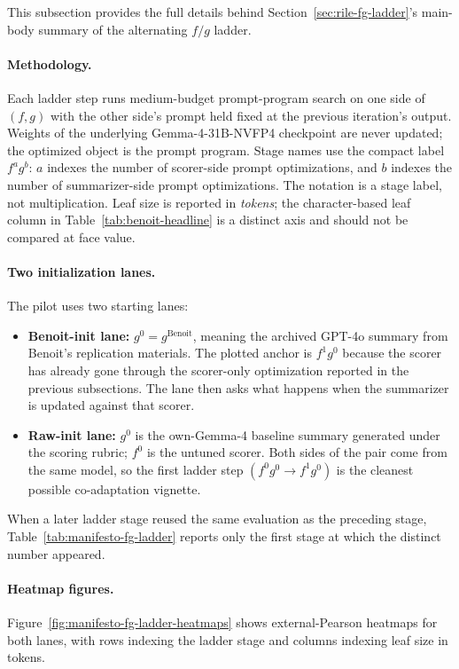 This subsection provides the full details behind
Section~\ref{sec:rile-fg-ladder}'s main-body summary of the alternating
$f/g$ ladder.

\paragraph{Methodology.} Each ladder step runs medium-budget
prompt-program search on one side of $(f, g)$ with the other side's
prompt held fixed at the previous iteration's output. Weights of the
underlying Gemma-4-31B-NVFP4 checkpoint are never updated; the optimized
object is the prompt program. Stage names use the compact label
$f^a g^b$: $a$ indexes the number of scorer-side prompt optimizations,
and $b$ indexes the number of summarizer-side prompt optimizations. The
notation is a stage label, not multiplication. Leaf size is reported in
\emph{tokens}; the character-based leaf column in
Table~\ref{tab:benoit-headline} is a distinct axis and should not be
compared at face value.

\paragraph{Two initialization lanes.} The pilot uses two starting
lanes:
\begin{itemize}[leftmargin=1.5em]
    \item \textbf{Benoit-init lane:} $g^0 = g^{\mathrm{Benoit}}$, meaning the
          archived GPT-4o summary from Benoit's replication materials.
          The plotted anchor is $f^1 g^0$ because the scorer has already
          gone through the scorer-only optimization reported in the
          previous subsections. The lane then asks what happens when the
          summarizer is updated against that scorer.
    \item \textbf{Raw-init lane:} $g^0$ is the
          own-Gemma-4 baseline summary generated under the scoring
          rubric; $f^0$ is the untuned scorer. Both sides of the
          pair come from the same model, so the first ladder
          step $(f^0 g^0 \to f^1 g^0)$ is the cleanest possible
          co-adaptation vignette.
\end{itemize}
When a later ladder stage reused the same evaluation as the preceding
stage, Table~\ref{tab:manifesto-fg-ladder} reports only the first stage
at which the distinct number appeared.

\paragraph{Heatmap figures.} Figure~\ref{fig:manifesto-fg-ladder-heatmaps}
shows external-Pearson heatmaps for both lanes, with rows indexing the
ladder stage and columns indexing leaf size in tokens.

